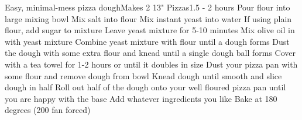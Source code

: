 \begin{recipe}{Easy, minimal-mess pizza dough}{Makes 2 13" Pizzas}{1.5 - 2 hours}
Pour flour into large mixing bowl
Mix salt into flour
Mix instant yeast into water
If using plain flour, add sugar to mixture
Leave yeast mixture for 5-10 minutes
Mix olive oil in with yeast mixture
Combine yeast mixture with flour until a dough forms
Dust the dough with some extra flour and knead until a single dough ball forms
Cover with a tea towel for 1-2 hours or until it doubles in size
Dust your pizza pan with some flour and remove dough from bowl
Knead dough until smooth and slice dough in half
Roll out half of the dough onto your well floured pizza pan until you are happy with the base
Add whatever ingredients you like
Bake at 180 degrees (200 fan forced)
\end{recipe}